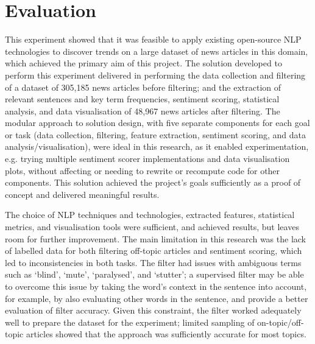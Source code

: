 \documentclass{report}
\begin{document}
\section{Evaluation} \label{Evaluation}

This experiment showed that it was feasible to apply existing open-source NLP technologies to discover trends on a large dataset of news articles in this domain, which achieved the primary aim of this project.
The solution developed to perform this experiment delivered in performing the data collection and filtering of a dataset of 305,185 news articles before filtering; 
and the extraction of relevant sentences and key term frequencies, sentiment scoring, statistical analysis, and data visualisation of 48,967 news articles after filtering.
The modular approach to solution design, with five separate components for each goal or task (data collection, filtering, feature extraction, sentiment scoring, and data analysis/visualisation), were ideal in this research, as it enabled experimentation, e.g. trying multiple sentiment scorer implementations and data visualisation plots, without affecting or needing to rewrite or recompute code for other components.
This solution achieved the project's goals sufficiently as a proof of concept and delivered meaningful results.

The choice of NLP techniques and technologies, extracted features, statistical metrics, and visualisation tools were sufficient, and achieved results, but leaves room for further improvement.
The main limitation in this research was the lack of labelled data for both filtering off-topic articles and sentiment scoring, which led to inconsistencies in both tasks.
The filter had issues with ambiguous terms such as `blind', `mute', `paralysed', and `stutter'; 
a supervised filter may be able to overcome this issue by taking the word's context in the sentence into account, for example, by also evaluating other words in the sentence, and provide a better evaluation of filter accuracy. 
Given this constraint, the filter worked adequately well to prepare the dataset for the experiment;
limited sampling of on-topic/off-topic articles showed that the approach was sufficiently accurate for most topics.
\end{document}

